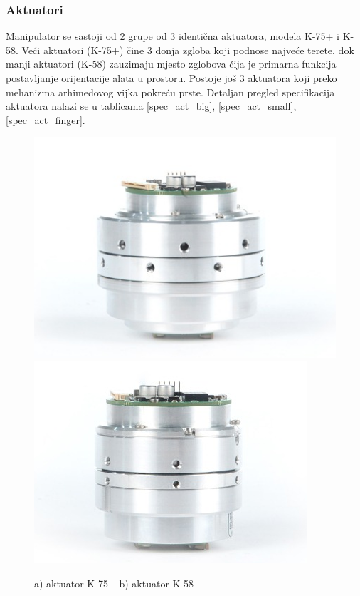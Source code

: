 \documentclass[times, utf8, diplomski, numeric]{fer}
\begin{document}
\subsubsection{Aktuatori}

Manipulator se sastoji od 2 grupe od 3 identična aktuatora, modela K-75+ i K-58.
Veći aktuatori (K-75+) čine 3 donja zgloba koji podnose najveće terete, dok manji aktuatori (K-58) zauzimaju mjesto zglobova čija je primarna funkcija postavljanje orijentacije alata u prostoru.
Postoje još 3 aktuatora koji preko mehanizma arhimedovog vijka pokreću prste. 
Detaljan pregled specifikacija aktuatora nalazi se u tablicama \ref{spec_act_big}, \ref{spec_act_small}, \ref{spec_act_finger}.

\begin{figure}[h!]
\includegraphics[scale=0.5]{k75plus}
\includegraphics[scale=0.5]{k58}
\caption{a) aktuator K-75+ b) aktuator K-58}
\end{figure}
\end{document}
